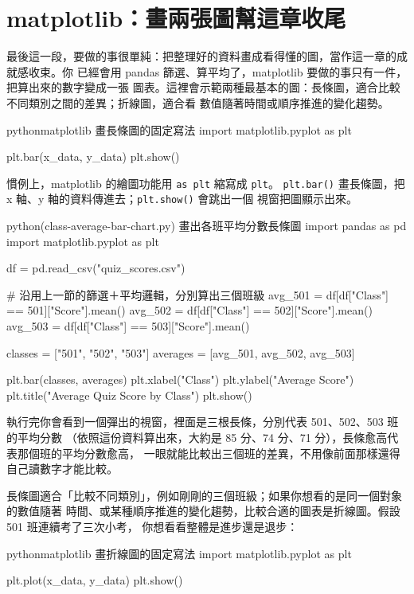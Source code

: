 \section{matplotlib：畫兩張圖幫這章收尾}
\label{sec:matplotlib-basic}

最後這一段，要做的事很單純：把整理好的資料畫成看得懂的圖，當作這一章的成就感收束。你
已經會用 pandas 篩選、算平均了，matplotlib 要做的事只有一件，把算出來的數字變成一張
圖表。這裡會示範兩種最基本的圖：長條圖，適合比較不同類別之間的差異；折線圖，適合看
數值隨著時間或順序推進的變化趨勢。

\begin{code}{python}{matplotlib 畫長條圖的固定寫法}
import matplotlib.pyplot as plt

plt.bar(x_data, y_data)
plt.show()
\end{code}

慣例上，matplotlib 的繪圖功能用 \texttt{as plt} 縮寫成 \texttt{plt}。
\texttt{plt.bar()} 畫長條圖，把 x 軸、y 軸的資料傳進去；\texttt{plt.show()} 會跳出一個
視窗把圖顯示出來。

\begin{example}{python}{(class-average-bar-chart.py) 畫出各班平均分數長條圖}
import pandas as pd
import matplotlib.pyplot as plt

df = pd.read_csv("quiz_scores.csv")

# 沿用上一節的篩選＋平均邏輯，分別算出三個班級
avg_501 = df[df["Class"] == 501]["Score"].mean()
avg_502 = df[df["Class"] == 502]["Score"].mean()
avg_503 = df[df["Class"] == 503]["Score"].mean()

classes = ["501", "502", "503"]
averages = [avg_501, avg_502, avg_503]

plt.bar(classes, averages)
plt.xlabel("Class")
plt.ylabel("Average Score")
plt.title("Average Quiz Score by Class")
plt.show()
\end{example}

執行完你會看到一個彈出的視窗，裡面是三根長條，分別代表 501、502、503 班的平均分數
（依照這份資料算出來，大約是 85 分、74 分、71 分），長條愈高代表那個班的平均分數愈高，
一眼就能比較出三個班的差異，不用像前面那樣還得自己讀數字才能比較。

長條圖適合「比較不同類別」，例如剛剛的三個班級；如果你想看的是同一個對象的數值隨著
時間、或某種順序推進的變化趨勢，比較合適的圖表是折線圖。假設 501 班連續考了三次小考，
你想看看整體是進步還是退步：

\begin{code}{python}{matplotlib 畫折線圖的固定寫法}
import matplotlib.pyplot as plt

plt.plot(x_data, y_data)
plt.show()
\end{code}

